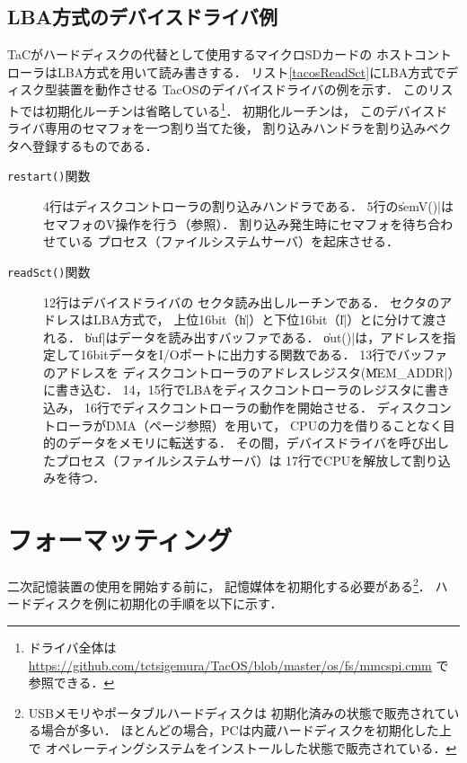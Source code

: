 \subsection{LBA方式のデバイスドライバ例}
TaCがハードディスクの代替として使用するマイクロSDカードの
ホストコントローラはLBA方式を用いて読み書きする．
リスト\ref{tacosReadSct}にLBA方式でディスク型装置を動作させる
TacOSのデイバイスドライバの例を示す．
このリストでは初期化ルーチンは省略している\footnote{
ドライバ全体は
\url{https://github.com/tctsigemura/TacOS/blob/master/os/fs/mmcspi.cmm}
で参照できる．}．
初期化ルーチンは，
このデバイスドライバ専用のセマフォを一つ割り当てた後，
割り込みハンドラを割り込みベクタへ登録するものである．



\begin{description}
\item[\texttt{restart()}関数]
  4行はディスクコントローラの割り込みハンドラである．
  5行の\|semV()|はセマフォのV操作を行う（参照）．
  割り込み発生時にセマフォを待ち合わせている
  プロセス（ファイルシステムサーバ）を起床させる．
\item[\texttt{readSct()}関数] 12行はデバイスドライバの
  セクタ読み出しルーチンである．
  セクタのアドレスはLBA方式で，
  上位16bit（\|h|）と下位16bit（\|l|）とに分けて渡される．
  \|buf|はデータを読み出すバッファである．
  \|out()|は，アドレスを指定して16bitデータをI/Oポートに出力する関数である．
  13行でバッファのアドレスを
  ディスクコントローラのアドレスレジスタ(\|MEM_ADDR|）に書き込む．
    14，15行でLBAをディスクコントローラのレジスタに書き込み，
    16行でディスクコントローラの動作を開始させる．
    ディスクコントローラがDMA（\pageref{dma}ページ参照）を用いて，
    CPUの力を借りることなく目的のデータをメモリに転送する．
    その間，デバイスドライバを呼び出したプロセス（ファイルシステムサーバ）は
    17行でCPUを解放して割り込みを待つ．
\end{description}

\section{フォーマッティング}
二次記憶装置の使用を開始する前に，
記憶媒体を初期化する必要がある\footnote{
USBメモリやポータブルハードディスクは
初期化済みの状態で販売されている場合が多い．
ほとんどの場合，PCは内蔵ハードディスクを初期化した上で
オペレーティングシステムをインストールした状態で販売されている．
}．
ハードディスクを例に初期化の手順を以下に示す．

